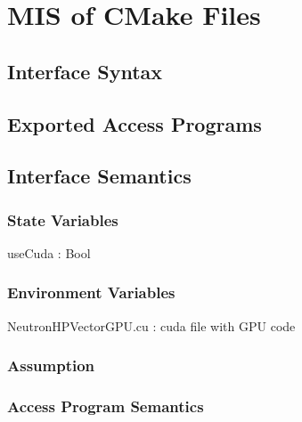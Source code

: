 \documentclass[12pt]{article}
\begin{document}
\section{MIS of CMake Files}

\subsection{Interface Syntax}%

\subsection{Exported Access Programs}%

\subsection{Interface Semantics}

\subsubsection{State Variables}%
useCuda : Bool

\subsubsection{Environment Variables}%
NeutronHPVectorGPU.cu : cuda file with GPU code

\subsubsection{Assumption}%

\subsubsection{Access Program Semantics}%
\end{document}
